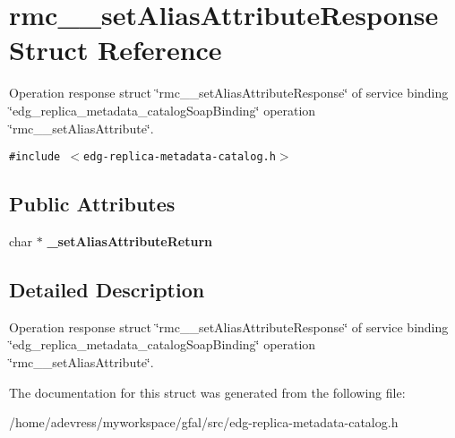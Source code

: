 \section{rmc\_\-\_\-set\-Alias\-Attribute\-Response Struct Reference}
\label{structrmc____setAliasAttributeResponse}
Operation response struct \char`\"{}rmc\_\-\_\-set\-Alias\-Attribute\-Response\char`\"{} of service binding \char`\"{}edg\_\-replica\_\-metadata\_\-catalog\-Soap\-Binding\char`\"{} operation \char`\"{}rmc\_\-\_\-set\-Alias\-Attribute\char`\"{}.  


{\tt \#include $<$edg-replica-metadata-catalog.h$>$}

\subsection*{Public Attributes}
\begin{CompactItemize}
\item 
char $\ast$ \textbf{\_\-set\-Alias\-Attribute\-Return}\label{structrmc____setAliasAttributeResponse_f72a9f2661888c89f4922d5e8bdd2f2f}

\end{CompactItemize}


\subsection{Detailed Description}
Operation response struct \char`\"{}rmc\_\-\_\-set\-Alias\-Attribute\-Response\char`\"{} of service binding \char`\"{}edg\_\-replica\_\-metadata\_\-catalog\-Soap\-Binding\char`\"{} operation \char`\"{}rmc\_\-\_\-set\-Alias\-Attribute\char`\"{}. 



The documentation for this struct was generated from the following file:\begin{CompactItemize}
\item 
/home/adevress/myworkspace/gfal/src/edg-replica-metadata-catalog.h\end{CompactItemize}
